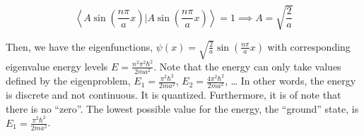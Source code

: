 \documentclass[12pt,]{book}
\begin{document}
\begin{equation}\left\langle A\sin\left(\frac{n\pi}{a} x\right) 
\bigg\rvert A\sin\left(\frac{n\pi}{a} x\right)\right\rangle = 1
\implies A =\sqrt{\frac{2}{a}}
\label{eq:adjointness_finds_lambda}\end{equation}

Then, we have the eigenfunctions,
\(\psi(x)=\sqrt{\frac{2}{a}}\sin\left(\frac{n\pi}{a} x\right)\) with
corresponding eigenvalue energy levels
\(E=\frac{n^2\pi^2\hbar^2}{2ma^2}\). Note that the energy can only take
values defined by the eigenproblem, \(E_1=\frac{\pi^2\hbar^2}{2ma^2}\),
\(E_2=\frac{4\pi^2\hbar^2}{2ma^2}\), \ldots{} In other words, the energy
is discrete and not continuous. It is quantized. Furthermore, it is of
note that there is no ``zero''. The lowest possible value for the
energy, the ``ground'' state, is \(E_1=\frac{\pi^2\hbar^2}{2ma^2}\).

\vfill
\end{document}
